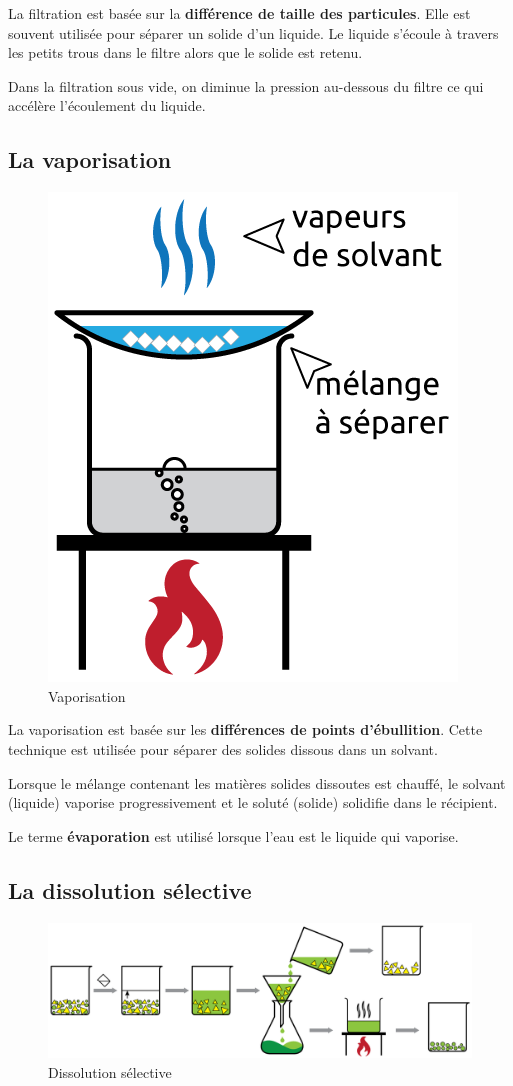 \documentclass[
  11pt,
  a4paper,
  openany]{book}
\begin{document}
La filtration est basée sur la \textbf{différence de taille des particules}. Elle est souvent utilisée pour séparer un solide d'un liquide. Le liquide s'écoule à travers les petits trous dans le filtre alors que le solide est retenu.

Dans la filtration sous vide, on diminue la pression au-dessous du filtre ce qui accélère l'écoulement du liquide.

\newpage

\subsection{La vaporisation}\label{la-vaporisation}

\begin{figure}

{\centering \includegraphics[width=0.25\linewidth]{images/evaporation} 

}

\caption{Vaporisation}\label{fig:evaporation}
\end{figure}

La vaporisation est basée sur les \textbf{différences de points d'ébullition}. Cette technique est utilisée pour séparer des solides dissous dans un solvant.

Lorsque le mélange contenant les matières solides dissoutes est chauffé, le solvant (liquide) vaporise progressivement et le soluté (solide) solidifie dans le récipient.

Le terme \textbf{évaporation} est utilisé lorsque l'eau est le liquide qui vaporise.

\subsection{La dissolution sélective}\label{la-dissolution-suxe9lective}


\begin{figure}

{\centering \includegraphics[width=0.85\linewidth]{images/dissolution-selective} 

}

\caption{Dissolution sélective}\label{fig:dissolution-selective}
\end{figure}
\end{document}
